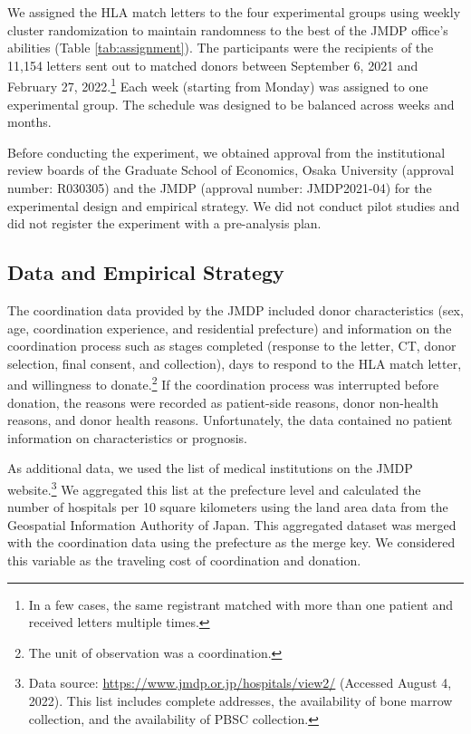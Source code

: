 \documentclass[12pt, a4paper]{article}
\begin{document}
We assigned the HLA match letters to the four experimental groups using weekly cluster randomization to maintain randomness to the best of the JMDP office's abilities (Table \ref{tab:assignment}). The participants were the recipients of the 11,154 letters sent out to matched donors between September 6, 2021 and February 27, 2022.\footnote{In a few cases, the same registrant matched with more than one patient and received letters multiple times.} Each week (starting from Monday) was assigned to one experimental group. The schedule was designed to be balanced across weeks and months.

Before conducting the experiment, we obtained approval from the institutional review boards of the Graduate School of Economics, Osaka University (approval number: R030305) and the JMDP (approval number: JMDP2021-04) for the experimental design and empirical strategy. We did not conduct pilot studies and did not register the experiment with a pre-analysis plan.

\hypertarget{data}{%
\subsection{Data and Empirical Strategy}\label{data}}

The coordination data provided by the JMDP included donor characteristics (sex, age, coordination experience, and residential prefecture) and information on the coordination process such as stages completed (response to the letter, CT, donor selection, final consent, and collection), days to respond to the HLA match letter, and willingness to donate.\footnote{The unit of observation was a coordination.} If the coordination process was interrupted before donation, the reasons were recorded as patient-side reasons, donor non-health reasons, and donor health reasons. Unfortunately, the data contained no patient information on characteristics or prognosis.

As additional data, we used the list of medical institutions on the JMDP website.\footnote{Data source: \url{https://www.jmdp.or.jp/hospitals/view2/} (Accessed August 4, 2022). This list includes complete addresses, the availability of bone marrow collection, and the availability of PBSC collection.} We aggregated this list at the prefecture level and calculated the number of hospitals per 10 square kilometers using the land area data from the Geospatial Information Authority of Japan. This aggregated dataset was merged with the coordination data using the prefecture as the merge key. We considered this variable as the traveling cost of coordination and donation.
\end{document}
